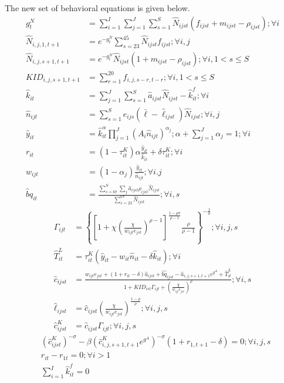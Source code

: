 \documentclass[letterpaper,12pt]{article}
\theoremstyle{definition}
\numberwithin{equation}{section}
\begin{document}
\begin{spacing}{1.5}
	The new set of behavioral equations is given below.
	\begin{align}
		g^N_t & = \sum_{i=1}^I \sum_{j=1}^J \sum_{s=1}^S \hat N_{ijst} (f_{ijst}+m_{ijst}-\rho_{ijst}) ; \forall i\\
		\hat N_{i,j,1,t+1} & = e^{-g^N_t}\sum_{s=23}^{45} \hat N_{ijst} f_{ijst} ; \forall i,j\\
		\hat N_{i,j,s+1,t+1} & = e^{-g^N_t}\hat N_{ijst} (1+m_{ijst}-\rho_{ijst}); \forall i, 1<s\le S \\
		KID_{i,j,s+1,t+1} & = \sum_{r=1}^{20} f_{i,j,s-r,t-r}; \forall i, 1<s\le S \\
	    \hat k_{it} & = \sum_{j=1}^J \sum_{s=1}^S \hat a_{ijst} \hat N_{ijst} - \hat k_{it}^f; \forall i \\
		\hat n_{ijt} & = \sum_{s=1}^S e_{ijs} (\bar \ell - \hat \ell_{ijst}) \hat N_{ijst}; \forall i,j \\
		\hat y_{it} & = \hat k_{it}^\alpha \prod_{j=1}^J \left( A_{i} \hat n_{ijt} \right)^{\alpha_j}; \alpha + \sum_{j=1}^J \alpha_j = 1 ; \forall i \\
		r_{it} & = (1-\tau^K_{it})\alpha \frac{\hat y_{it}}{\hat k_{it}} + \delta \tau^K_{it}; \forall i \\
		w_{ijt} & = (1-\alpha_j) \frac{\hat y_{it}}{\hat n_{ijt}}; \forall i.j \\
		\hat bq_{it} & = \frac{\sum_{s=67}^S \sum_j \hat a_{ijst} \rho_{ijst} \hat N_{ijst}}{\sum_{s=23}^{67} \hat N_{ijst}} ; \forall i,s
	\end{align}
	\begin{align}
		\Gamma_{ijt} & = \left\{ \left[1 + \chi \left(\frac{\chi}{w_{ijt} e_{jst}}\right)^{\rho-1}\right]^{\tfrac{1-\rho \sigma}{\rho-1}} \frac{\rho}{\rho-1} \right\}^{-\tfrac{1}{\sigma}}; \forall i,j,s \\
		\hat T^L_{it} & = \tau^K_{it} (\hat y_{it} - w_{it}\hat n_{it} - \delta \hat k_{it}); \forall i \\
    	\hat c_{ijst} & = \frac{w_{ijt} e_{jst} + (1+r_{it}-\delta)\hat a_{ijst} + \hat{bq}_{ijst} - \hat a_{i,j,s+1,t+1} e^{g^A} + \hat T^L_{it}} {1 + KID_{ist}\Gamma_{ijt} + \left(\tfrac{\chi}{w_{ijt}e_{jst}}\right)^\rho}; \forall i,s \\
		\hat \ell_{ijst} & = \hat c_{ijst} \left(\frac{\chi}{w_{ijt}e_{jst}}\right)^{\frac{1-\rho}{\rho}} ; \forall i,j,s \\
		\hat c^K_{ijst} & = \hat c_{ijst} \Gamma_{ijt}; \forall i,j,s
	\end{align}
	\begin{align}
		& \left({\hat c^K_{ijst}}\right)^{-\sigma} - \beta \left(\hat c^K_{i,j,s+1,t+1} e^{g^A}\right)^{-\sigma}(1+r_{1,t+1}-\delta) = 0; \forall i,j,s \\
		& r_{it} - r_{1t} = 0; \forall i>1 \\
		& \sum_{i=1}^I \hat k^f_{it} = 0
	\end{align}

\end{spacing}
\end{document}
